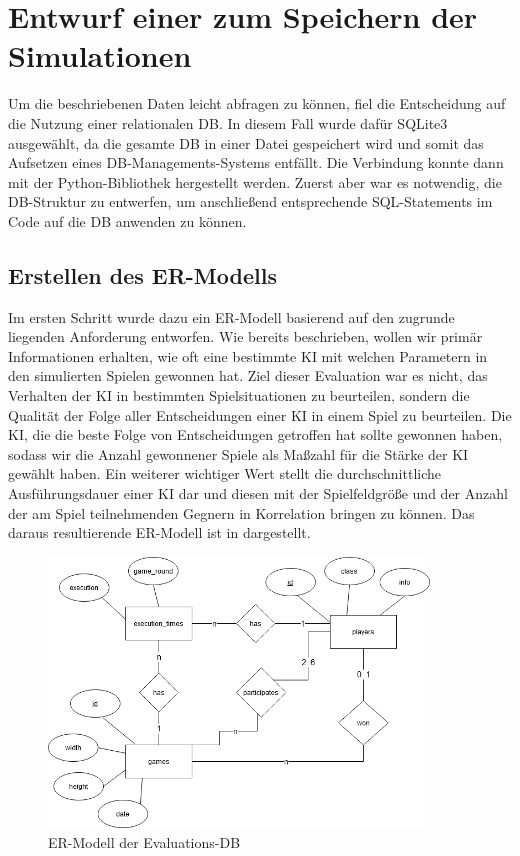 \section{Entwurf einer  zum Speichern der Simulationen}
\label{sec:entwurf-datenbank}

Um die beschriebenen Daten leicht abfragen zu können, fiel die Entscheidung auf die Nutzung einer relationalen
\ac{DB}.
In diesem Fall wurde dafür SQLite3 ausgewählt, da die gesamte \ac{DB} in einer Datei gespeichert wird und somit das
Aufsetzen eines \acl{DB}-Managements-Systems entfällt. 
Die Verbindung konnte dann mit der Python-Bibliothek   hergestellt werden.
Zuerst aber war es notwendig, die \ac{DB}-Struktur zu entwerfen, um anschließend entsprechende SQL-Statements im Code
auf die \ac{DB} anwenden zu können.

\subsection{Erstellen des \acl{ER}-Modells}
\label{subsec:er-modell}

Im ersten Schritt wurde dazu ein \ac{ER}-Modell basierend auf den zugrunde liegenden Anforderung entworfen.
Wie bereits beschrieben, wollen wir primär Informationen erhalten, wie oft eine
bestimmte \ac{KI} mit welchen Parametern in den simulierten Spielen gewonnen hat.
Ziel dieser Evaluation war es nicht, das Verhalten der \ac{KI} in bestimmten Spielsituationen zu beurteilen,
sondern die Qualität der Folge aller Entscheidungen einer \ac{KI} in einem Spiel zu beurteilen.
Die \ac{KI}, die die beste Folge von Entscheidungen getroffen hat sollte gewonnen haben, sodass wir die Anzahl
gewonnener Spiele als Maßzahl für die Stärke der \ac{KI} gewählt haben.
Ein weiterer wichtiger Wert stellt die durchschnittliche Ausführungsdauer einer \ac{KI} dar und diesen \ua
mit der Spielfeldgröße und der Anzahl der am Spiel teilnehmenden Gegnern in Korrelation bringen zu können.
Das daraus resultierende \ac{ER}-Modell ist in  dargestellt.

\begin{figure}[htb]
	\centering
	\includegraphics[width=0.9\textwidth]{Bilder/er-diagram.png}
	\caption{\ac{ER}-Modell der Evaluations-\ac{DB}}
	\label{fig:er-schema}
\end{figure}

